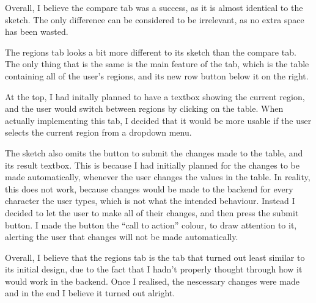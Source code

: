 \documentclass[12pt]{report}
\begin{document}
Overall, I believe the compare tab was a success, as it is almost identical to the sketch. The only difference can be considered to be irrelevant, as no extra space has been wasted.

The regions tab looks a bit more different to its sketch than the compare tab. The only thing that is the same is the main feature of the tab, which is the table containing all of the user's regions, and its new row button below it on the right.

At the top, I had initally planned to have a textbox showing the current region, and the user would switch between regions by clicking on the table. When actually implementing this tab, I decided that it would be more usable if the user selects the current region from a dropdown menu.

The sketch also omits the button to submit the changes made to the table, and its result textbox. This is because I had initially planned for the changes to be made automatically, whenever the user changes the values in the table. In reality, this does not work, because changes would be made to the backend for every character the user types, which is not what the intended behaviour. Instead I decided to let the user to make all of their changes, and then press the submit button. I made the button the ``call to action'' colour, to draw attention to it, alerting the user that changes will not be made automatically.

Overall, I believe that the regions tab is the tab that turned out least similar to its initial design, due to the fact that I hadn't properly thought through how it would work in the backend. Once I realised, the nescessary changes were made and in the end I believe it turned out alright.
\end{document}

